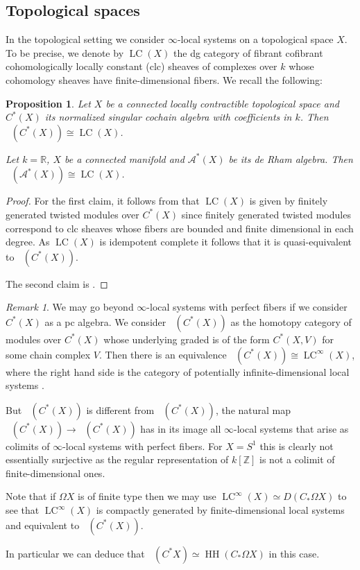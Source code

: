 \documentclass[a4paper]{amsart}
\theoremstyle{plain}
\newtheorem{prop}[thm]{Proposition}
\theoremstyle{definition}
\theoremstyle{remark}
\newtheorem{rem}[thm]{Remark}
\newcommand{\Z}{\mathbb{Z}}
\DeclareMathOperator{\DII}{D^{{II}}}%
\DeclareMathOperator{\Dctr}{D^{ctr}}
\DeclareMathOperator{\HH}{HH}
\DeclareMathOperator{\HHII}{HH^{\mathrm{II}}}
\DeclareMathOperator{\PerfII}{Perf^{\mathrm{II}}}
\DeclareMathOperator{\LC}{LC}
\numberwithin{equation}{section}
\theoremstyle{plain}
\begin{document}
	\subsection{Topological spaces}
	In the topological setting we consider $\infty$-local systems on a topological space $X$. To be precise, we denote by $\LC(X)$ the dg category of fibrant cofibrant cohomologically locally constant (clc)  sheaves of complexes over $k$ whose cohomology sheaves have finite-dimensional fibers. 
	We recall the following:
	\begin{prop}\label{prop:perf2ls}
		Let $X$ be a connected locally contractible topological space and $C^*(X)$ its normalized singular cochain algebra with coefficients in $k$.
		Then $\PerfII(C^*(X)) \cong \LC(X)$.
		
		Let $k = \mathbb R$, $X$ be a connected manifold and $\mathcal A^*(X)$ be its de Rham algebra. Then $\PerfII(\mathcal A^*(X)) \cong \LC(X)$.
	\end{prop}
	\begin{proof}
		For the first claim, it follows from \cite[Theorem 8.4]{chl21} that $\LC(X)$ is given by finitely generated twisted modules over $C^*(X)$ since
		finitely generated twisted modules correspond to clc sheaves whose fibers are bounded and finite dimensional in each degree. As $\LC(X)$ is idempotent complete it follows that it is quasi-equivalent to $\PerfII(C^*(X))$.
		
		The second claim is \cite[Theorem 8.1]{chl21}.
	\end{proof}
	\begin{rem}\label{rmk:contra}
		We may go beyond $\infty$-local systems with perfect fibers  if we consider $C^*(X)$ as a pc algebra. 
		We consider $\Dctr(C^*(X))$ as the homotopy  category of modules over $C^*(X)$ whose underlying graded is of the form $C^*(X, V)$ for some chain complex $V$.
		Then there is an equivalence $
		\Dctr(C^*(X)) \cong \LC^\infty(X)$, where the right hand side is the category of potentially infinite-dimensional local systems \cite[Theorem 8.4]{chl21}.
		
		But $\Dctr(C^*(X))$ is different from $\DII(C^*(X))$, the natural map $\DII(C^*(X)) \to \Dctr(C^*(X))$ has in its image all  $\infty$-local systems that arise as colimits of $\infty$-local systems with perfect fibers. 
		For $X = S^1$ this is clearly not essentially surjective as the regular representation of $k[\Z]$ is not a colimit of finite-dimensional ones.
		
		Note that if $\Omega X$ is of finite type then we may use $\LC^\infty(X) \simeq D(C_*\Omega X)$ to see that $\LC^\infty(X)$ is compactly generated by finite-dimensional local systems and equivalent to $\DII(C^*(X))$.
		
		In particular we can deduce that $\HHII(C^*X) \simeq \HH(C_*\Omega X)$ in this case.
	\end{rem}
	
\end{document}
